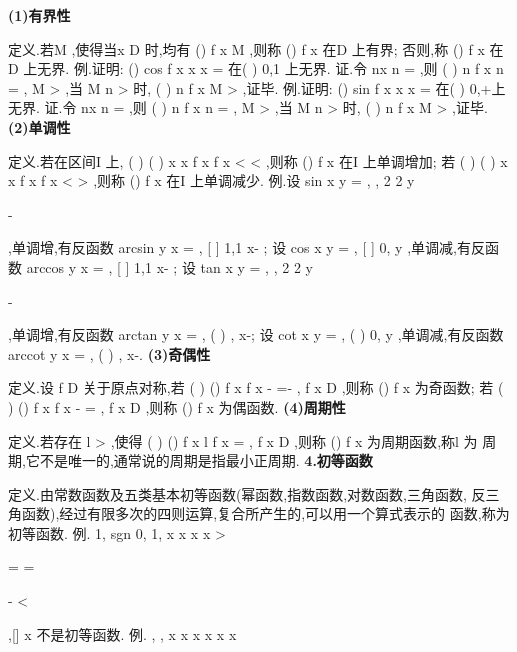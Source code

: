 {\bfseries \textcolor{lyred}{(1)有界性}}

\textcolor{lyred}{定义}.若M
\exists 
\in {},使得当x
D
\in 
时,均有
()
f x
M
\le 
,则称
()
f x 在D 上\textcolor{lyred}{有界}; 
否则,称
()
f x 在D 上\textcolor{lyred}{无界}. 
\textcolor{lyred}{例}.证明:
()
cos
f x
x
x
=
在(
)
0,1 上无界. 
证.令
nx
n\pi 
=
,则
(
)
n
f x
n\pi 
=
,
M
\forall 
>
,当
M
n
\pi 
>
时,
(
)
n
f x
M
>
,证毕. 
\textcolor{lyred}{例}.证明:
()
sin
f x
x
x
=
在(
)
0,+\infty 上无界. 
证.令
nx
n\pi 
=
,则
(
)
n
f x
n\pi 
=
,
M
\forall 
>
,当
M
n
\pi 
>
时,
(
)
n
f x
M
>
,证毕. 
{\bfseries \textcolor{lyred}{(2)单调性}}

\textcolor{lyred}{定义}.若在区间I 上,
(
)
(
)
x
x
f x
f x
<
\Rightarrow 
<
,则称
()
f x 在I 上\textcolor{lyred}{单调增加}; 
若
(
)
(
)
x
x
f x
f x
<
\Rightarrow 
>
,则称
()
f x 在I 上\textcolor{lyred}{单调减少}. 
\textcolor{lyred}{例}.设
sin
x
y
=
,
,
2 2
y
\pi \pi 


\in -




,单调增,有反函数
arcsin
y
x
=
,
[
]
1,1
x\in -
; 
设
cos
x
y
=
,
[
]
0,
y
\pi 
\in 
,单调减,有反函数
arccos
y
x
=
,
[
]
1,1
x\in -
; 
设
tan
x
y
=
,
,
2 2
y
\pi \pi 


\in -




,单调增,有反函数
arctan
y
x
=
,
(
)
,
x\in -\infty \infty ; 
设
cot
x
y
=
,
(
)
0,
y
\pi 
\in 
,单调减,有反函数
arccot
y
x
=
,
(
)
,
x\in -\infty \infty . 
{\bfseries \textcolor{lyred}{(3)奇偶性}}

\textcolor{lyred}{定义}.设
f
D 关于原点对称,若
(
)
()
f
x
f x
-
=-
,
f
x
D
\forall \in 
,则称
()
f x 为\textcolor{lyred}{奇函数}; 
若
(
)
()
f
x
f x
-
=
,
f
x
D
\forall \in 
,则称
()
f x 为\textcolor{lyred}{偶函数}. 
{\bfseries \textcolor{lyred}{(4)周期性}}

\textcolor{lyred}{定义}.若存在
l >
,使得
(
)
()
f x
l
f x
\pm 
=
,
f
x
D
\forall \in 
,则称
()
f x 为\textcolor{lyred}{周期函数},称l 为 
\textcolor{lyred}{周期},它不是唯一的,通常说的周期是指最小正周期. 
{\bfseries \textcolor{lyred}{4.初等函数}}

\textcolor{lyred}{定义}.由常数函数及五类基本初等函数(幂函数,指数函数,对数函数,三角函数, 
反三角函数),经过有限多次的四则运算,复合所产生的,可以用一个算式表示的 
函数,称为\textcolor{lyred}{初等函数}. 
\textcolor{lyred}{例}.
1,
sgn
0,
1,
x
x
x
x
>


=
=

-
<

,[]
x 不是初等函数. 
\textcolor{lyred}{例}.
,
,
x
x
x
x
x
x
\ge 

